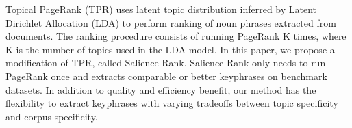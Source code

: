 Topical PageRank (TPR) uses latent topic distribution inferred by Latent Dirichlet Allocation (LDA) to perform ranking of noun phrases extracted from documents. The ranking procedure consists of running PageRank K times, where K is the number of topics used in the LDA model. In this paper, we propose a modification of TPR, called Salience Rank. Salience Rank only needs to run PageRank once and extracts comparable or better keyphrases on benchmark datasets. In addition to quality and efficiency benefit, our method has the flexibility to extract keyphrases with varying tradeoffs between topic specificity and corpus specificity.
